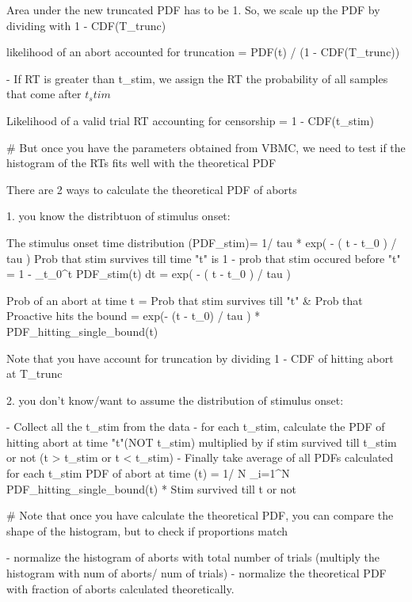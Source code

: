 

Area under the new truncated PDF has to be 1. So, we scale up the PDF by dividing with 1 - CDF(T_trunc)

likelihood of an abort accounted for truncation = PDF(t) / (1 - CDF(T_trunc))


- If RT is greater than t_stim, we assign the RT the probability of all samples that come after $t_stim$

Likelihood of a valid trial RT accounting for censorship = 1 - CDF(t_stim)



# But once you have the parameters obtained from VBMC, we need to test if the histogram of the RTs fits well with the theoretical PDF

There are 2 ways to calculate the theoretical PDF of aborts

1. you know the distribtuon of stimulus onset:

The stimulus onset time distribution (PDF_stim)= 1/ tau * exp( - ( t - t_0 ) / tau )
Prob that stim survives till time "t" is 1 - prob that stim occured before "t"
 =  1 - \int_{t_0}^{t} PDF_stim(t) dt = exp( - ( t - t_0 ) / tau )


 Prob of an abort at time t = Prob that stim survives till "t" & Prob that Proactive hits the bound
                             = exp(- (t - t_0) / tau ) * PDF_hitting_single_bound(t)


Note that you have account for truncation by dividing 1 - CDF of hitting abort at T_trunc

2. you don't know/want to assume the distribution of stimulus onset:

- Collect all the t_stim from the data
- for each t_stim, calculate the PDF of hitting abort at time "t"(NOT t_stim) multiplied by if stim survived till t_stim or not (t > t_stim or t < t_stim)
- Finally take average of all PDFs calculated for each t_stim
PDF of abort at time (t) = 1/ N \Sigma_{i=1}^{N} PDF_hitting_single_bound(t) * Stim survived till t or not 


# Note that once you have calculate the theoretical PDF, you can compare the shape of the histogram, 
but to check if proportions match

- normalize the histogram of aborts with total number of trials (multiply the histogram with num of aborts/ num of trials)
- normalize the theoretical PDF with fraction of aborts calculated theoretically. 

